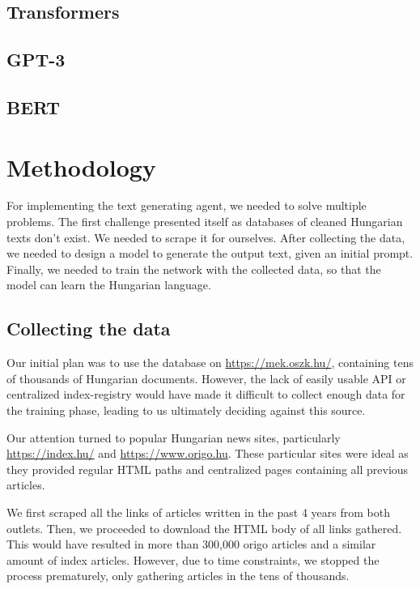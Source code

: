 \documentclass[journal]{IEEEtai}
\begin{document}
\subsection{Transformers}

\subsection{GPT-3}

\subsection{BERT}


\section{Methodology}
For implementing the text generating agent, we needed to solve multiple problems. The first challenge presented itself as databases of cleaned Hungarian texts don't exist. We needed to scrape it for ourselves. After collecting the data, we needed to design a model to generate the output text, given an initial prompt. Finally, we needed to train the network with the collected data, so that the model can learn the Hungarian language.  

\subsection{Collecting the data}
Our initial plan was to use the database on \href{https://mek.oszk.hu/}{https://mek.oszk.hu/}, containing tens of thousands of Hungarian documents. However, the lack of easily usable API or centralized index-registry would have made it difficult to collect enough data for the training phase, leading to us ultimately deciding against this source.

Our attention turned to popular Hungarian news sites, particularly \href{https://index.hu/}{https://index.hu/} and \href{https://www.origo.hu}{https://www.origo.hu}. These particular sites were ideal as they provided regular HTML paths and centralized pages containing all previous articles. 

We first scraped all the links of articles written in the past 4 years from both outlets. Then, we proceeded to download the HTML body of all links gathered. This would have resulted in more than 300,000 origo articles and a similar amount of index articles. However, due to time constraints, we stopped the process prematurely, only gathering articles in the tens of thousands.
\end{document}
